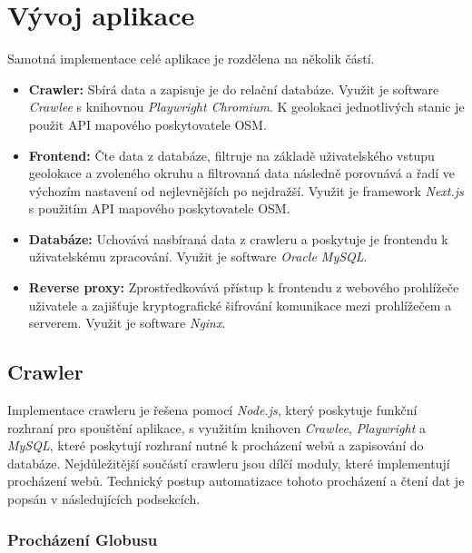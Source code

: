 \chapter{Vývoj aplikace}

Samotná implementace celé aplikace je rozdělena na několik částí.

\begin{itemize}
    \item \textbf{Crawler:} Sbírá data a zapisuje je do relační databáze.
        Využit je software \emph{Crawlee} s knihovnou \emph{Playwright Chromium}.
        K geolokaci jednotlivých stanic je použit API mapového poskytovatele OSM.
    \item \textbf{Frontend:} Čte data z databáze, filtruje na základě
        uživatelského vstupu geolokace a zvoleného okruhu a filtrovaná
        data následně porovnává a řadí ve výchozím nastavení od nejlevnějších
        po nejdražší. Využit je framework \emph{Next.js} s použitím API
        mapového poskytovatele OSM.
    \item \textbf{Databáze:} Uchovává nasbíraná data z crawleru a poskytuje je
        frontendu k uživatelskému zpracování. Využit je software \emph{Oracle MySQL}.
    \item \textbf{Reverse proxy:} Zprostředkovává přístup k frontendu z webového
        prohlížeče uživatele a zajišťuje kryptografické šifrování komunikace
        mezi prohlížečem a serverem. Využit je software \emph{Nginx}.
\end{itemize}

\section{Crawler}

Implementace crawleru je řešena pomocí \emph{Node.js}, který poskytuje funkční
rozhraní pro spouštění aplikace, s využitím knihoven \emph{Crawlee},
\emph{Playwright} a \emph{MySQL}, které poskytují rozhraní nutné k procházení
webů a zapisování do databáze. Nejdůležitější součástí crawleru jsou dílčí
moduly, které implementují procházení webů. Technický postup automatizace
tohoto procházení a čtení dat je popsán v následujících podsekcích.

\subsection{Procházení Globusu}

